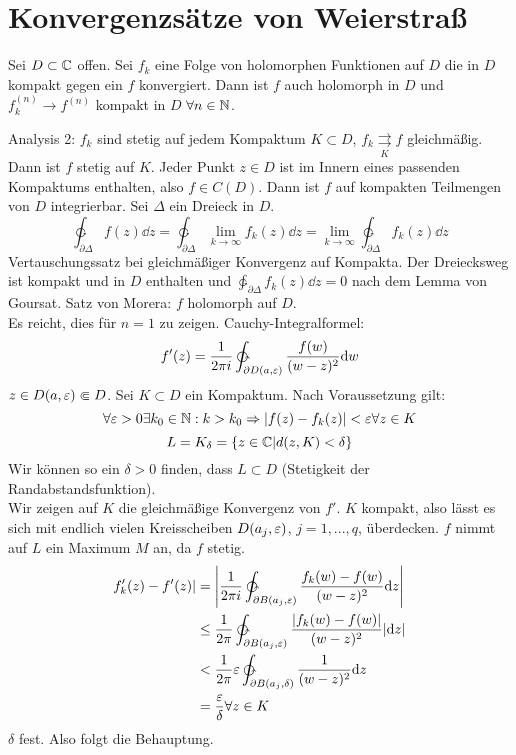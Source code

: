 \section{Konvergenzs\"atze von Weierstra\ss}
\begin{satz}
	Sei $ D\subset\mathbb{C} $ offen. Sei $ f_k $ eine Folge von holomorphen Funktionen auf $ D $ die in $ D $ kompakt gegen ein $ f $ konvergiert. Dann ist $ f $ auch holomorph in $ D $ und $ f^{(n)}_k\rightarrow f^{(n)} $ kompakt in $ D $ $ \forall n\in\mathbb{N} $.
\end{satz}
\begin{beweis}
	Analysis 2: $ f_k $ sind stetig auf jedem Kompaktum $ K\subset D $, $ f_k\underset{K}{\rightrightarrows}f $ gleichm\"a\ss ig. Dann ist $ f $ stetig auf $ K $. Jeder Punkt $ z\in D $ ist im Innern eines passenden Kompaktums enthalten, also $ f\in C(D) $. Dann ist $ f $ auf kompakten Teilmengen von $ D $ integrierbar. Sei $ \Delta $ ein Dreieck in $ D $.
	\[ \ointctrclockwise_{\partial\Delta}f(z)\dd z=\ointctrclockwise_{\partial\Delta}\lim_{k\to\infty}f_k(z)\dd z=\lim_{k\to\infty}\ointctrclockwise_{\partial\Delta}f_k(z)\dd z \]
	Vertauschungssatz bei gleichm\"a\ss iger Konvergenz auf Kompakta. Der Dreiecksweg ist kompakt und in $ D $ enthalten und $ \ointctrclockwise_{\partial\Delta}f_k(z)\dd z=0 $ nach dem Lemma von Goursat. Satz von Morera: $ f $ holomorph auf $ D $. \\
	Es reicht, dies f\"ur $ n=1 $ zu zeigen. Cauchy-Integralformel:
	\[ f'(z)=\frac{1}{2\pi i}\ointctrclockwise_{\partial D(a,\e)}\frac{f(w)}{(w-z)^2}\dd w \]
	$ z\in D(a,\varepsilon)\Subset D $. Sei $ K\subset D $ ein Kompaktum. Nach Voraussetzung gilt:
	\[ \forall\varepsilon>0\exists k_0\in\mathbb{N}:k>k_0\Rightarrow |f(z)-f_k(z)|<\varepsilon\forall z\in K \]
	\[ L=K_\delta=\lbrace z\in\mathbb{C}|d(z,K)<\delta\rbrace \]
	Wir k\"onnen so ein $ \delta>0 $ finden, dass $ L\subset D $ (Stetigkeit der Randabstandsfunktion).\\
	Wir zeigen auf $ K $ die gleichm\"a\ss ige Konvergenz von $ f' $. $ K $ kompakt, also l\"asst es sich mit endlich vielen Kreisscheiben $ D(a_j,\varepsilon) $, $ j=1,...,q $, \"uberdecken. $ f $ nimmt auf $ L $ ein Maximum $ M $ an, da $ f $ stetig. 
	\begin{align*} f_k'(z)-f'(z)|&=\left|\frac{1}{2\pi i}\ointctrclockwise_{\partial B(a_j,\e)}\frac{f_k(w)-f(w)}{(w-z)^2}\dd z\right|\\&\leq\frac{1}{2\pi}\ointctrclockwise_{\partial B(a_j,\e)}\frac{|f_k(w)-f(w)|}{(w-z)^2}|\dd z|\\&<\frac{1}{2\pi}\e\ointctrclockwise_{\partial B(a_j,\delta)}\frac{1}{(w-z)^2}\dd z\\&=\frac{\e}{\delta}\forall z\in K \end{align*}
	$ \delta $ fest. Also folgt die Behauptung. 
\end{beweis}
